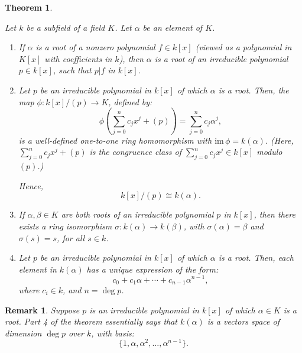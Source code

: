 \documentclass[a4paper,12pt]{report}
\newcommand{\im}{\mathrm{im}\,}
\newcommand{\ra}{\longrightarrow}
\newcounter{statement}
\numberwithin{statement}{chapter}
\newtheorem{thm}[statement]{Theorem}
\newtheorem*{remark}{\bf Remark}
\numberwithin{equation}{chapter}
\numberwithin{section}{chapter}
\numberwithin{subsection}{section}
\begin{document}
\begin{thm}
\label{thm:simpleextthm}


Let $k$ be a subfield of a field $K$.  Let $\alpha$ be an element of $K$.
\begin{enumerate}
\item 
If $\alpha$ is a root of a nonzero polynomial $f \in k[x]$
(viewed as a polynomial in $K[x]$ with coefficients in $k$),
then $\alpha$ is a root of an irreducible polynomial $p \in k[x]$,
such that $p | f$ in $k[x]$.

\item 
Let $p$ be an irreducible polynomial in $k[x]$ of which $\alpha$ is a root.
Then, the map $\phi : k[x]/(p) \ra K$,
defined by:
\[
\phi\left(\sum_{j = 0}^nc_jx^j + (p)\right) = \sum_{j = 0}^n c_j\alpha^j,
\]
is a well-defined one-to-one ring homomorphism with $\im \phi = k(\alpha)$.
(Here, $\sum_{j = 0}^nc_jx^j + (p)$ is the congruence class of $\sum_{j = 0}^nc_jx^j \in k[x]$
modulo $(p)$.)



Hence,
\[
k[x]/(p) \cong k(\alpha).
\]

\item 
If $\alpha, \beta \in K$ are both roots of an irreducible polynomial $p$ in $k[x]$,
then there exists a ring isomorphism $\sigma : k(\alpha) \ra k(\beta)$,
with $\sigma(\alpha) = \beta$ and $\sigma(s) = s$, for all $s \in k$.

\item 
Let $p$ be an irreducible polynomial in $k[x]$ of which $\alpha$ is a root.
Then, each element in $k(\alpha)$ has a unique expression of the form:
\[
c_0 + c_1\alpha + \cdots + c_{n - 1}\alpha^{n - 1},
\]
where $c_i \in k$, and $n = \deg p$.
\end{enumerate}
\end{thm}



\begin{remark}

Suppose $p$ is an irreducible polynomial in $k[x]$ of which $\alpha \in K$ is a root.
Part 4 of the theorem essentially says that $k(\alpha)$ is a vectors space of dimension $\deg p$
over $k$, with basis:
\[
\{1, \alpha, \alpha^2,\ldots, \alpha^{n - 1}\}.
\]

\end{remark}
\end{document}
